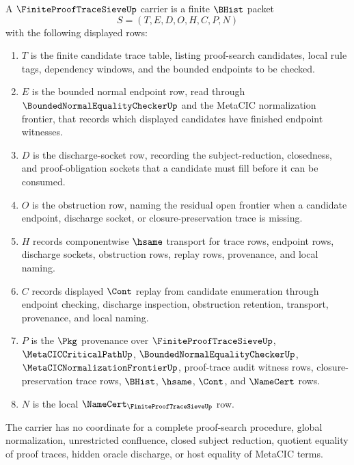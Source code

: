 \begin{definition}
\label{def:finite-proof-trace-sieve-carrier}
A $\FiniteProofTraceSieveUp$ carrier is a finite $\BHist$ packet
$$
S=(T,E,D,O,H,C,P,N)
$$
with the following displayed rows:
\begin{enumerate}
\item $T$ is the finite candidate trace table, listing proof-search candidates, local rule tags, dependency windows, and the bounded endpoints to be checked.
\item $E$ is the bounded normal endpoint row, read through $\BoundedNormalEqualityCheckerUp$ and the MetaCIC normalization frontier, that records which displayed candidates have finished endpoint witnesses.
\item $D$ is the discharge-socket row, recording the subject-reduction, closedness, and proof-obligation sockets that a candidate must fill before it can be consumed.
\item $O$ is the obstruction row, naming the residual open frontier when a candidate endpoint, discharge socket, or closure-preservation trace is missing.
\item $H$ records componentwise $\hsame$ transport for trace rows, endpoint rows, discharge sockets, obstruction rows, replay rows, provenance, and local naming.
\item $C$ records displayed $\Cont$ replay from candidate enumeration through endpoint checking, discharge inspection, obstruction retention, transport, provenance, and local naming.
\item $P$ is the $\Pkg$ provenance over $\FiniteProofTraceSieveUp$, $\MetaCICCriticalPathUp$, $\BoundedNormalEqualityCheckerUp$, $\MetaCICNormalizationFrontierUp$, proof-trace audit witness rows, closure-preservation trace rows, $\BHist$, $\hsame$, $\Cont$, and $\NameCert$ rows.
\item $N$ is the local $\NameCert_{\FiniteProofTraceSieveUp}$ row.
\end{enumerate}
The carrier has no coordinate for a complete proof-search procedure, global normalization, unrestricted confluence, closed subject reduction, quotient equality of proof traces, hidden oracle discharge, or host equality of MetaCIC terms.
\end{definition}

